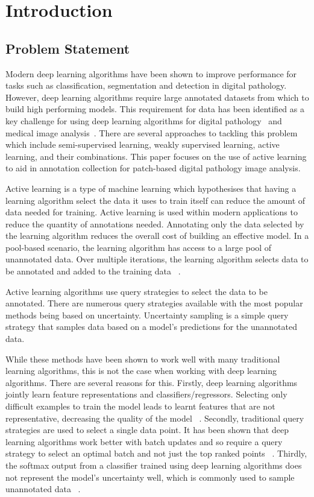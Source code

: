 \section{Introduction}

\subsection{Problem Statement}
Modern deep learning algorithms have been shown to improve performance for tasks such as classification, segmentation and detection in digital pathology. However, deep learning algorithms require large annotated datasets from which to build high performing models. This requirement for data has been identified as a key challenge for using deep learning algorithms for digital pathology~\cite{tizhoosh2018artificial} and medical image analysis~\cite{geert2017survey}. There are several approaches to tackling this problem which include semi-supervised learning, weakly supervised learning, active learning, and their combinations. This paper focuses on the use of active learning to aid in annotation collection for patch-based digital pathology image analysis.

Active learning is a type of machine learning which hypothesises that having a learning algorithm select the data it uses to train itself can reduce the amount of data needed for training. Active learning is used within modern applications to reduce the quantity of annotations needed. Annotating only the data selected by the learning algorithm reduces the overall cost of building an effective model. In a pool-based scenario, the learning algorithm has access to a large pool of unannotated data. Over multiple iterations, the learning algorithm selects data to be annotated and added to the training data ~\cite{settles2012active}.

Active learning algorithms use query strategies to select the data to be annotated. There are numerous query strategies available with the most popular methods being based on uncertainty. Uncertainty sampling is a simple query strategy that samples data based on a model’s predictions for the unannotated data.

While these methods have been shown to work well with many  traditional learning algorithms, this is not the case when working with deep learning algorithms. There are several reasons for this. Firstly, deep learning algorithms jointly learn feature representations and classifiers/regressors. Selecting only difficult examples to train the model leads to learnt features that are not representative, decreasing the quality of the model ~\cite{wang2018ceal}. Secondly, traditional query strategies are used to select a single data point. It has been shown that deep learning algorithms work better with batch updates and so require a query strategy to select an optimal batch and not just the top ranked points ~\cite{sener2018active}. Thirdly, the softmax output from a classifier trained using deep learning algorithms does not represent the model’s uncertainty well, which is commonly used to sample unannotated data ~\cite{gal2017deep}.

